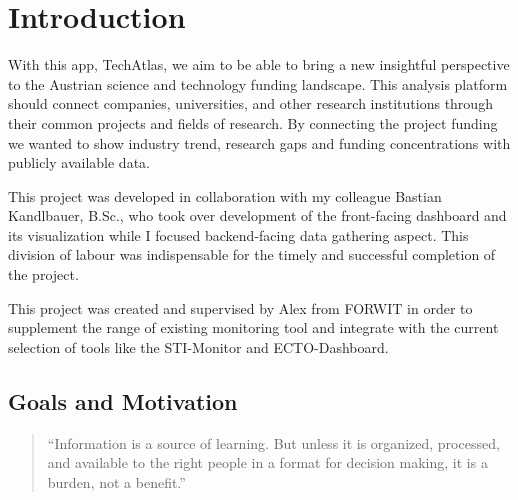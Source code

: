 \chapter{Introduction}

With this app, TechAtlas, we aim to be able to bring a new insightful perspective to the Austrian science and technology funding landscape.
This analysis platform should connect companies, universities, and other research institutions through their common projects and fields of research.
By connecting the project funding we wanted to show industry trend, research gaps and funding concentrations with publicly available data.


This project was developed in collaboration with my colleague Bastian Kandlbauer, B.Sc., who took over
development of the front-facing dashboard and its visualization while I focused backend-facing data
gathering aspect. This division of labour was indispensable for the timely and successful completion of the project.

This project was created and supervised by  Alex from FORWIT in order to supplement the range of existing monitoring tool and integrate with the current selection of tools like the STI-Monitor and ECTO-Dashboard.  

\section{Goals and Motivation}

\begin{quote}
    \enquote{Information is a source of learning. But unless it is organized, processed, and available to the right people in a format for decision making, it is a burden, not a benefit.} \\
    \citet{Pollard}
\end{quote}

